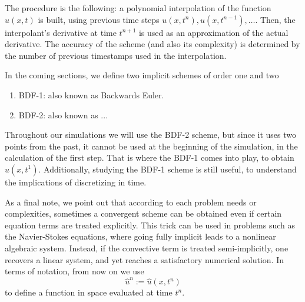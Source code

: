 \documentclass[../../main.tex]{subfiles}
\begin{document}
The procedure is the following: a polynomial interpolation of the function $u(x,t)$ is built, 
using previous time steps $u(x,t^{n}), u(x,t^{n-1}), \ldots$.
Then, the interpolant's derivative at time $t^{n+1}$ is used as an approximation of the actual derivative.
The accuracy of the scheme (and also its complexity) is determined by the number of previous timestamps used in the interpolation. 

In the coming sections, we define two implicit schemes of order one and two
\begin{enumerate}
    \item BDF-1: also known as Backwards Euler.
    \item BDF-2: also known as ... 
\end{enumerate}
Throughout our simulations we will use the BDF-2 scheme, but since it uses two points from the past, 
it cannot be used at the beginning of the simulation, in the calculation of the first step. 
That is where the BDF-1 comes into play, to obtain $u(x,t^1)$.
Additionally, studying the BDF-1 scheme is still useful, to understand the implications of discretizing in time.  

As a final note, we point out that according to each problem needs or complexities, sometimes a convergent scheme can be obtained even if certain equation terms are treated explicitly.
This trick can be used in problems such as the Navier-Stokes equations, where going fully implicit leads to a nonlinear algebraic system. 
Instead, if the convective term is treated semi-implicitly, one recovers a linear system, and yet reaches a satisfactory numerical solution.
In terms of notation, from now on we use
\begin{equation}
    \hat{u}^n := \hat{u}(x,t^n)
\end{equation}
to define a function in space evaluated at time $t^n$.
\end{document}
